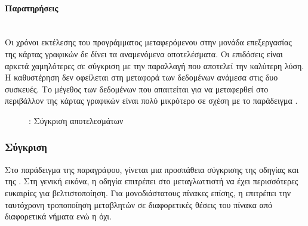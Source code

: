\paragraph{Παρατηρήσεις}
\ \\
Οι χρόνοι εκτέλεσης του προγράμματος μεταφερόμενου στην μονάδα επεξεργασίας της κάρτας γραφικών δε δίνει τα αναμενόμενα αποτελέσματα. Οι επιδόσεις είναι αρκετά χαμηλότερες σε σύγκριση με την παραλλαγή  που αποτελεί την καλύτερη λύση. Η καθυστέρηση δεν οφείλεται στη μεταφορά των δεδομένων ανάμεσα στις δυο συσκευές. Το μέγεθος των δεδομένων που απαιτείται για να μεταφερθεί στο περιβάλλον της κάρτας γραφικών είναι πολύ μικρότερο σε σχέση με το παράδειγμα .


\begin{figure}[h]
\centering 
\resizebox{0.6\textwidth}{!} {
}%
\caption{: Σύγκριση αποτελεσμάτων }
\end{figure}


\clearpage
\subsubsection{Σύγκριση }
Στο παράδειγμα της παραγράφου, γίνεται μια προσπάθεια σύγκρισης της οδηγίας  και της . Στη γενική εικόνα, η οδηγία  επιτρέπει στο μεταγλωττιστή να έχει περισσότερες ευκαιρίες για βελτιστοποίηση. Για μονοδιάστατους πίνακες επίσης, η  επιτρέπει την ταυτόχρονη τροποποίηση μεταβλητών σε διαφορετικές θέσεις του πίνακα από διαφορετικά νήματα ενώ η  όχι.

